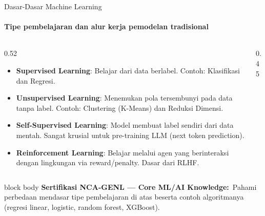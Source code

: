 \documentclass[aspectratio=169,t]{beamer}
\newcommand{\certnote}[2]{%
  \vspace{0.1em}
  \begin{beamercolorbox}[rounded=true,shadow=false,sep=4pt]{block body}
    {\scriptsize\color{nvblue}\textbf{Sertifikasi NCA-GENL --- #1:}}\,
    {\scriptsize\color{nvgray}#2}
  \end{beamercolorbox}%
}
\begin{document}
\begin{frame}{Dasar-Dasar Machine Learning}
  \framesubtitle{Tipe pembelajaran dan alur kerja pemodelan tradisional}
  \begin{columns}[T]
    \begin{column}{0.52\textwidth}
      \begin{itemize}\footnotesize
        \item \textbf{Supervised Learning}: Belajar dari data berlabel. Contoh: Klasifikasi dan Regresi.
        \item \textbf{Unsupervised Learning}: Menemukan pola tersembunyi pada data tanpa label. Contoh: Clustering (K-Means) dan Reduksi Dimensi.
        \item \textbf{Self-Supervised Learning}: Model membuat label sendiri dari data mentah. Sangat krusial untuk pre-training LLM (next token prediction).
        \item \textbf{Reinforcement Learning}: Belajar melalui agen yang berinteraksi dengan lingkungan via reward/penalty. Dasar dari RLHF.
      \end{itemize}
    \end{column}
    \begin{column}{0.45\textwidth}
      \begin{center}
      \end{center}
    \end{column}
  \end{columns}
  \certnote{Core ML/AI Knowledge}{Pahami perbedaan mendasar tipe pembelajaran di atas beserta contoh algoritmanya (regresi linear, logistic, random forest, XGBoost).}
\end{frame}
\end{document}
